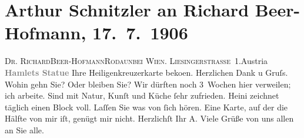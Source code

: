 

         
         \renewcommand{\erwaehntePersonen}{Personen: Richard Beer-Hofmann, Heinrich Schnitzler}
         \renewcommand{\erwaehnteOrte}{Orte: Heiligenkreuz, Helsingør, Liesingerstraße, Rodaun, Wien, Österreich}
         \renewcommand{\erwaehnteWerke}{Werke: Hamlet}
               \section[Arthur Schnitzler an Richard Beer-Hofmann, 17. 7. 1906]{ Arthur Schnitzler an Richard Beer-Hofmann, 17. 7. 1906}\nopagebreak{}\rehead{ }\begin{ledgroupsized}[t]{13cm}\normalsize\beginnumbering \toendnotes[C]{\smallbreak\pagebreak[2]} 
\pstart{}{\pb}\textsc{Dr. Richard}\pend{}\pstart{}\textsc{Beer-Hofmann}\pend{}\pstart{}\textsc{Rodaun}\pend{}\pstart{}\textsc{bei Wien}. \pend{}\pstart{}\textsc{Liesingerstraße 1}.\pend{}\pstart{}Austria\pend{}{\bigskip}\pstart
           \noindent{}{\pb}\textcolor{gray}{\textbf{Hamlets Statue}}\pend
           \pstart
           {\pb}Ihre Heiligenkreuzerkarte beko{\geminationm}en. Herzlichen Dank u
               Gruſs. Wohin gehn Sie? Oder bleiben Sie? Wir dürften noch 3 Wochen hier verweilen;
               ich arbeite. Sind mit Natur, Kunſt und Küche ſehr zufrieden. Heini zeichnet täglich einen Block voll. Laſſen Sie was von
               ſich hören. Eine Karte, auf der die Hälfte von mir iſt, genügt mir nicht. Herzlichſt
               Ihr \spacefill\mbox{A.}\pend
           \pstart
           \noindent{}{\pb}Viele Grüße von uns allen an Sie alle.\pend
           
         
         \endnumbering{}\end{ledgroupsized}  \newcommand{\dateiname}{L01613}\newcommand{\titel}{Arthur Schnitzler an Richard Beer-Hofmann, 17. 7. 1906}\newcommand{\editorInnen}{Martin Anton Müller und Gerd-Hermann Susen}
      